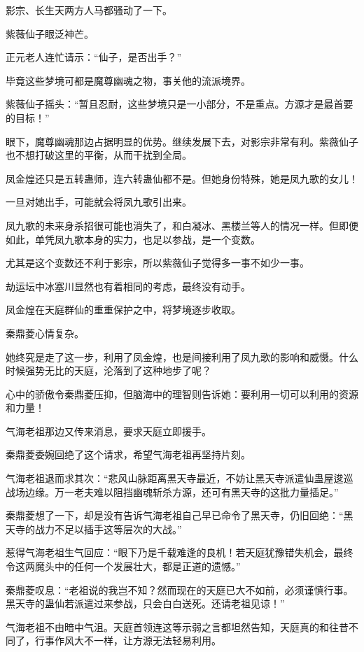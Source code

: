 \begin{this_body}
影宗、长生天两方人马都骚动了一下。

紫薇仙子眼泛神芒。

正元老人连忙请示：“仙子，是否出手？”

毕竟这些梦境可都是魔尊幽魂之物，事关他的流派境界。

紫薇仙子摇头：“暂且忍耐，这些梦境只是一小部分，不是重点。方源才是最首要的目标！”

眼下，魔尊幽魂那边占据明显的优势。继续发展下去，对影宗非常有利。紫薇仙子也不想打破这里的平衡，从而干扰到全局。

凤金煌还只是五转蛊师，连六转蛊仙都不是。但她身份特殊，她是凤九歌的女儿！

一旦对她出手，可能就会将凤九歌引出来。

凤九歌的未来身杀招很可能也消失了，和白凝冰、黑楼兰等人的情况一样。但即便如此，单凭凤九歌本身的实力，也足以参战，是一个变数。

尤其是这个变数还不利于影宗，所以紫薇仙子觉得多一事不如少一事。

劫运坛中冰塞川显然也有着相同的考虑，最终没有动手。

凤金煌在天庭群仙的重重保护之中，将梦境逐步收取。

秦鼎菱心情复杂。

她终究是走了这一步，利用了凤金煌，也是间接利用了凤九歌的影响和威慑。什么时候强势无比的天庭，沦落到了这种地步了呢？

心中的骄傲令秦鼎菱压抑，但脑海中的理智则告诉她：要利用一切可以利用的资源和力量！

气海老祖那边又传来消息，要求天庭立即援手。

秦鼎菱委婉回绝了这个请求，希望气海老祖再坚持片刻。

气海老祖退而求其次：“悲风山脉距离黑天寺最近，不妨让黑天寺派遣仙蛊屋逡巡战场边缘。万一老夫难以阻挡幽魂斩杀方源，还可有黑天寺的这批力量插足。”

秦鼎菱想了一下，却是没有告诉气海老祖自己早已命令了黑天寺，仍旧回绝：“黑天寺的战力不足以插手这等层次的大战。”

惹得气海老祖生气回应：“眼下乃是千载难逢的良机！若天庭犹豫错失机会，最终令这两魔头中的任何一个发展壮大，都是正道的遗憾。”

秦鼎菱叹息：“老祖说的我岂不知？然而现在的天庭已大不如前，必须谨慎行事。黑天寺的蛊仙若派遣过来参战，只会白白送死。还请老祖见谅！”

气海老祖不由暗中气沮。天庭首领连这等示弱之言都坦然告知，天庭真的和往昔不同了，行事作风大不一样，让方源无法轻易利用。


\end{this_body}
